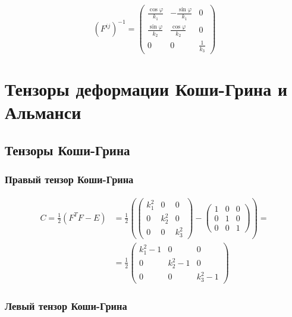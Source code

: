 \documentclass[14pt,a4paper]{scrartcl}
\begin{document}
\begin{equation*}
	\left(F^{i j}\right)^{-1}=\left(\begin{array}{ccc}
	\frac{\cos \varphi}{k_{1}} & -\frac{\sin \varphi}{k_{1}} & 0 \\
	\frac{\sin \varphi}{k_{2}} & \frac{\cos \varphi}{k_{2}} & 0 \\
	0 & 0 & \frac{1}{k_{3}}
	\end{array}\right)
\end{equation*}


\section{Тензоры деформации Коши-Грина и Альманси}

\subsection{Тензоры Коши-Грина}

\subsubsection*{Правый тензор Коши-Грина}

\begin{align*}
	\left.C=\frac{1}{2}\left(F^{T} F-E\right)&=\frac{1}{2}\left(\left(\begin{array}{ccc}
	k_{1}^{2} & 0 & 0 \\
	0 & k_{2}^{2} & 0 \\
	0 & 0 & k_{3}^{2}
	\end{array}\right)-\left(\begin{array}{ccc}
	1 & 0 & 0 \\
	0 & 1 & 0 \\
	0 & 0 & 1
	\end{array}\right)\right)= \\
	&= \frac{1}{2}\left(\begin{array}{ccc}
	k_{1}^{2}-1 & 0 & 0 \\
	0 & k_{2}^{2}-1 & 0 \\
	0 & 0 & k_{3}^{2}-1
	\end{array}\right)
\end{align*}





\subsubsection*{Левый тензор Коши-Грина}
\end{document}
